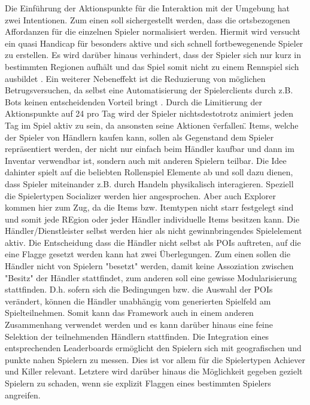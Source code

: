 Die Einführung der Aktionspunkte für die Interaktion mit der Umgebung hat zwei Intentionen. Zum einen soll sichergestellt werden, dass die ortsbezogenen Affordanzen für die einzelnen Spieler normalisiert werden. Hiermit wird versucht ein quasi Handicap für besonders aktive und sich schnell fortbewegenende Spieler zu erstellen. Es wird darüber hinaus verhindert, dass der Spieler sich nur kurz in bestimmten Regionen aufhält und das Spiel somit nicht zu einem Rennspiel sich ausbildet \cite{Schlieder.2005}. Ein weiterer Nebeneffekt ist die Reduzierung von möglichen Betrugsversuchen, da selbst eine Automatisierung der Spielerclients durch z.B. Bots keinen entscheidenden Vorteil bringt \cite{Golle.2005}. Durch die Limitierung der Aktionspunkte auf 24 pro Tag wird der Spieler nichtsdestotrotz animiert jeden Tag im Spiel aktiv zu sein, da ansonsten seine Aktionen \"verfallen\". Items, welche der Spieler von Händlern kaufen kann, sollen als Gegenstand dem Spieler repräsentiert werden, der nicht nur einfach beim Händler kaufbar und dann im Inventar verwendbar ist, sondern auch mit anderen Spielern teilbar. Die Idee dahinter spielt auf die beliebten Rollenspiel Elemente ab und soll dazu dienen, dass Spieler miteinander z.B. durch Handeln physikalisch interagieren. Speziell die Spielertypen Socializer werden hier angesprochen. Aber auch Explorer kommen hier zum Zug, da die Items bzw. Itemtypen nicht starr festgelegt sind und somit jede REgion oder jeder Händler individuelle Items besitzen kann. Die Händler/Dienstleister selbst werden hier als nicht gewinnbringendes Spielelement aktiv. Die Entscheidung dass die Händler nicht selbst als POIs auftreten, auf die eine Flagge gesetzt werden kann hat zwei Überlegungen. Zum einen sollen die Händler nicht von Spielern "besetzt" werden, damit keine Assoziation zwischen "Besitz" der Händler stattfindet, zum anderen soll eine gewisse Modularisierung stattfinden. D.h. sofern sich die Bedingungen bzw. die Auswahl der POIs verändert, können die Händler unabhängig vom generierten Spielfeld am Spielteilnehmen. Somit kann das Framework auch in einem anderen Zusammenhang verwendet werden und es kann darüber hinaus eine feine Selektion der teilnehmenden Händlern stattfinden.
Die Integration eines entsprechenden Leaderboards ermöglicht den Spielern sich mit geografischen und punkte nahen Spielern zu messen. Dies ist vor allem für die Spielertypen Achiever und Killer relevant. Letztere wird darüber hinaus die Möglichkeit gegeben gezielt Spielern zu schaden, wenn sie explizit Flaggen eines bestimmten Spielers angreifen.
\\\\

